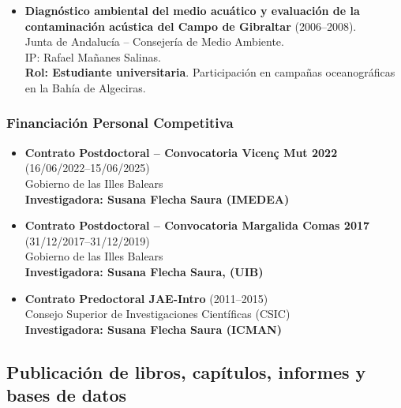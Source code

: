 \documentclass[11pt,a4paper]{article}
\begin{document}
\begin{itemize}[leftmargin=*]
    \item \textbf{Diagnóstico ambiental del medio acuático y evaluación de la contaminación acústica del Campo de Gibraltar} (2006--2008).\\
    Junta de Andalucía – Consejería de Medio Ambiente.\\
    IP: Rafael Mañanes Salinas.\\
    \textbf{Rol: Estudiante universitaria}. Participación en campañas oceanográficas en la Bahía de Algeciras.

\end{itemize}
\subsubsection{Financiación Personal Competitiva}

\begin{itemize}[leftmargin=*]

    \item \textbf{Contrato Postdoctoral -- Convocatoria Vicenç Mut 2022} (16/06/2022--15/06/2025)\\
    Gobierno de las Illes Balears\\
    \textbf{Investigadora: Susana Flecha Saura (IMEDEA)}

    \item \textbf{Contrato Postdoctoral -- Convocatoria Margalida Comas 2017} (31/12/2017--31/12/2019)\\
    Gobierno de las Illes Balears\\
      \textbf{Investigadora: Susana Flecha Saura, (UIB)}

    \item \textbf{Contrato Predoctoral JAE-Intro} (2011--2015)\\
    Consejo Superior de Investigaciones Científicas (CSIC)\\
  \textbf{Investigadora: Susana Flecha Saura (ICMAN)}
\end{itemize}


\subsection{Publicación de libros, capítulos, informes y bases de datos}
\end{document}
